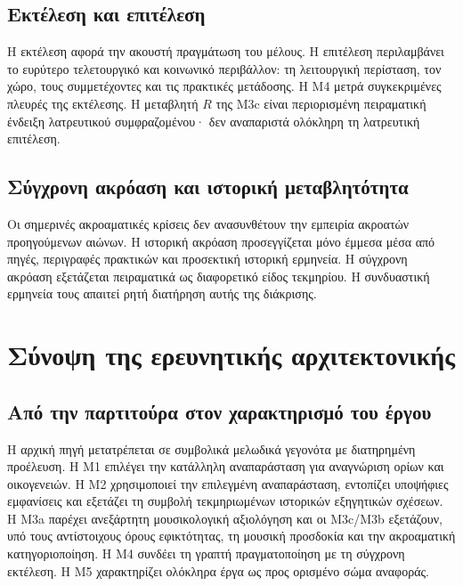 \documentclass[11pt,a4paper]{extarticle}
\begin{document}
\subsection*{Εκτέλεση και επιτέλεση}
Η εκτέλεση αφορά την ακουστή πραγμάτωση του μέλους. Η επιτέλεση περιλαμβάνει το ευρύτερο τελετουργικό και κοινωνικό περιβάλλον: τη λειτουργική περίσταση, τον χώρο, τους συμμετέχοντες και τις πρακτικές μετάδοσης. Η M4 μετρά συγκεκριμένες πλευρές της εκτέλεσης. Η μεταβλητή \(R\) της M3c είναι περιορισμένη πειραματική ένδειξη λατρευτικού συμφραζομένου· δεν αναπαριστά ολόκληρη τη λατρευτική επιτέλεση.

\subsection*{Σύγχρονη ακρόαση και ιστορική μεταβλητότητα}
Οι σημερινές ακροαματικές κρίσεις δεν ανασυνθέτουν την εμπειρία ακροατών προηγούμενων αιώνων. Η ιστορική ακρόαση προσεγγίζεται μόνο έμμεσα μέσα από πηγές, περιγραφές πρακτικών και προσεκτική ιστορική ερμηνεία. Η σύγχρονη ακρόαση εξετάζεται πειραματικά ως διαφορετικό είδος τεκμηρίου. Η συνδυαστική ερμηνεία τους απαιτεί ρητή διατήρηση αυτής της διάκρισης.

\section{Σύνοψη της ερευνητικής αρχιτεκτονικής}

\subsection*{Από την παρτιτούρα στον χαρακτηρισμό του έργου}
Η αρχική πηγή μετατρέπεται σε συμβολικά μελωδικά γεγονότα με διατηρημένη προέλευση. Η M1 επιλέγει την κατάλληλη αναπαράσταση για αναγνώριση ορίων και οικογενειών. Η M2 χρησιμοποιεί την επιλεγμένη αναπαράσταση, εντοπίζει υποψήφιες εμφανίσεις και εξετάζει τη συμβολή τεκμηριωμένων ιστορικών εξηγητικών σχέσεων. Η M3a παρέχει ανεξάρτητη μουσικολογική αξιολόγηση και οι M3c/M3b εξετάζουν, υπό τους αντίστοιχους όρους εφικτότητας, τη μουσική προσδοκία και την ακροαματική κατηγοριοποίηση. Η M4 συνδέει τη γραπτή πραγματοποίηση με τη σύγχρονη εκτέλεση. Η M5 χαρακτηρίζει ολόκληρα έργα ως προς ορισμένο σώμα αναφοράς.
\end{document}
